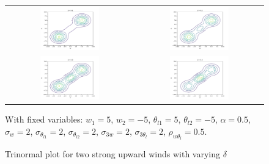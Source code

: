 \begin{figure}[!htb]
    \centering
    \begin{tabular}{cc}
        \multicolumn{1}{c}{\includegraphics[width=0.48\textwidth]{include/figures/plot3_1}} &
        \multicolumn{1}{c}{\includegraphics[width=0.48\textwidth]{include/figures/plot3_2}} \\
        \multicolumn{1}{c}{\includegraphics[width=0.48\textwidth]{include/figures/plot3_3}} &
        \multicolumn{1}{c}{\includegraphics[width=0.48\textwidth]{include/figures/plot3_4}} \\
    \end{tabular}
    \caption{Trinormal plot for two strong upward winds with varying $\delta$}
    \label{fig:plot3}
    With fixed variables: $w_1 = 5$, $w_2 = -5$, $\theta_{l1} = 5$, $\theta_{l2} = -5$,
    $\alpha = 0.5$, $\sigma_w = 2$, $\sigma_{\theta_{l1}} = 2$,  $\sigma_{\theta_{l2}} = 2$,
    $\sigma_{3w} = 2$, $\sigma_{3\theta_l} = 2$, $\rho_{w\theta_l} = 0.5$.
\end{figure}

